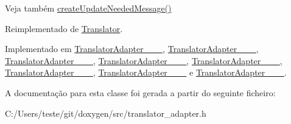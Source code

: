 \begin{DoxySeeAlso}{Veja também}
\hyperlink{class_translator_adapter_base_a5a2e61bbeb05968eed2d1e7fa9030c87}{create\-Update\-Needed\-Message()} 
\end{DoxySeeAlso}


Reimplementado de \hyperlink{class_translator_aa2c053398a494e36caf5152d9a4fc6cf}{Translator}.



Implementado em \hyperlink{class_translator_adapter__1__4__6_aa2c053398a494e36caf5152d9a4fc6cf}{Translator\-Adapter\-\_\-\_\-\_}, \hyperlink{class_translator_adapter__1__5__4_aa2c053398a494e36caf5152d9a4fc6cf}{Translator\-Adapter\-\_\-\_\-\_}, \hyperlink{class_translator_adapter__1__6__0_aa2c053398a494e36caf5152d9a4fc6cf}{Translator\-Adapter\-\_\-\_\-\_}, \hyperlink{class_translator_adapter__1__6__3_aa2c053398a494e36caf5152d9a4fc6cf}{Translator\-Adapter\-\_\-\_\-\_}, \hyperlink{class_translator_adapter__1__7__5_aa2c053398a494e36caf5152d9a4fc6cf}{Translator\-Adapter\-\_\-\_\-\_}, \hyperlink{class_translator_adapter__1__8__0_aa2c053398a494e36caf5152d9a4fc6cf}{Translator\-Adapter\-\_\-\_\-\_}, \hyperlink{class_translator_adapter__1__8__2_aa2c053398a494e36caf5152d9a4fc6cf}{Translator\-Adapter\-\_\-\_\-\_} e \hyperlink{class_translator_adapter__1__8__4_aa2c053398a494e36caf5152d9a4fc6cf}{Translator\-Adapter\-\_\-\_\-\_}.



A documentação para esta classe foi gerada a partir do seguinte ficheiro\-:\begin{DoxyCompactItemize}
\item 
C\-:/\-Users/teste/git/doxygen/src/translator\-\_\-adapter.\-h\end{DoxyCompactItemize}
